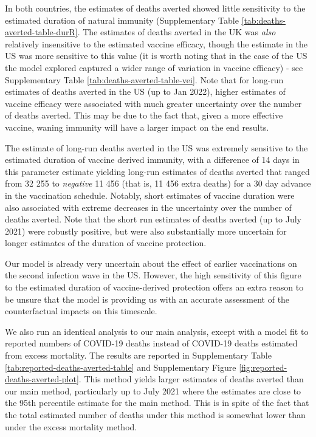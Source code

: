 \documentclass{article}
\begin{document}
In both countries, the estimates of deaths averted showed little sensitivity to the estimated duration of natural immunity (Supplementary Table \ref{tab:deaths-averted-table-durR}. The estimates of deaths averted in the UK was \emph{also} relatively insensitive to the estimated vaccine efficacy, though the estimate in the US was more sensitive to this value (it is worth noting that in the case of the US the model explored captured a wider range of variation in vaccine efficacy) - see Supplementary Table \ref{tab:deaths-averted-table-vei}. Note that for long-run estimates of deaths averted in the US (up to Jan 2022), higher estimates of vaccine efficacy were associated with much greater uncertainty over the number of deaths averted. This may be due to the fact that, given a more effective vaccine, waning immunity will have a larger impact on the end results.

The estimate of long-run deaths averted in the US was extremely sensitive to the estimated duration of vaccine derived immunity, with a difference of 14 days in this parameter estimate yielding long-run estimates of deaths averted that ranged from 32 255 to \emph{negative} 11 456 (that is, 11 456 extra deaths) for a 30 day advance in the vaccination schedule. Notably, short estimates of vaccine duration were also associated with extreme decreases in the uncertainty over the number of deaths averted. Note that the short run estimates of deaths averted (up to July 2021) were robustly positive, but were also substantially more uncertain for longer estimates of the duration of vaccine protection.

Our model is already very uncertain about the effect of earlier vaccinations on the second infection wave in the US. However, the high sensitivity of this figure to the estimated duration of vaccine-derived protection offers an extra reason to be unsure that the model is providing us with an accurate assessment of the counterfactual impacts on this timescale.

We also run an identical analysis to our main analysis, except with a model fit to reported numbers of COVID-19 deaths instead of COVID-19 deaths estimated from excess mortality. The results are reported in Supplementary Table \ref{tab:reported-deaths-averted-table} and Supplementary Figure \ref{fig:reported-deaths-averted-plot}. This method yields larger estimates of deaths averted than our main method, particularly up to July 2021 where the estimates are close to the 95th percentile estimate for the main method. This is in spite of the fact that the total estimated number of deaths under this method is somewhat lower than under the excess mortality method.
\end{document}
